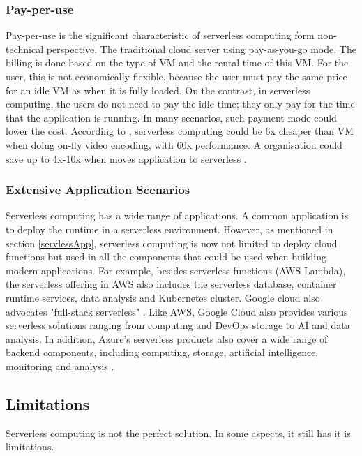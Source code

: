 \subsubsection{Pay-per-use}
Pay-per-use is the significant characteristic of serverless computing form non-technical perspective. The traditional cloud server using pay-as-you-go mode. The billing is done based on the type of VM and the rental time of this VM. For the user, this is not economically flexible, because the user must pay the same price for an idle VM as when it is fully loaded. On the contrast, in serverless computing, the users do not need to pay the idle time; they only pay for the time that the application is running. In many scenarios, such payment mode could lower the cost. According to \cite{jonas2019cloud}, serverless computing could be 6x cheaper than VM when doing on-fly video encoding, with 60x performance. A organisation could save up to 4x-10x when moves application to serverless \cite{jonas2019cloud}\cite{Serverle67:online}.
\subsubsection{Extensive Application Scenarios}
Serverless computing has a wide range of applications. A common application is to deploy the runtime in a serverless environment.
However, as mentioned in section \ref{servlessApp}, serverless computing is now not limited to deploy cloud functions but used in all the components that could be used when building modern applications. 
For example, besides serverless functions (AWS Lambda), the serverless offering in AWS also includes the serverless database, container runtime services, data analysis and Kubernetes cluster. Google cloud also advocates "full-stack serverless" \cite{Serverle29:online}. Like AWS, Google Cloud also provides various serverless solutions ranging from computing and DevOps storage to AI and data analysis. In addition, Azure's serverless products also cover a wide range of backend components, including computing, storage, artificial intelligence, monitoring and analysis \cite{AzureSer56:online}.
\subsection{Limitations}
\label{servlesslimitation}
Serverless computing is not the perfect solution. In some aspects, it still has it is limitations.
